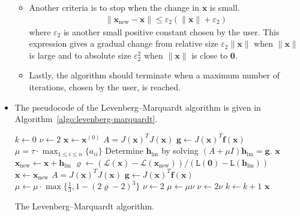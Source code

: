 \documentclass[10pt]{article}
\newcommand{\ve}[1]{\mathbf{#1}}
\newcommand{\mrm}[1]{\mathrm{#1}}
\newcommand{\mcal}[1]{\mathcal{#1}}
\begin{document}
\begin{itemize}
\begin{itemize}
        \item Another criteria is to stop when the change in $\ve{x}$ is small.
        \begin{align*}
            \| \ve{x}_{\mrm{new}} - \ve{x} \| \leq \varepsilon_2 (\| \ve{x}\| + \varepsilon_2)
        \end{align*}
        where $\varepsilon_2$ is another small positive constant chosen by the user. This expression gives a gradual change from relative size $\varepsilon_2 \| \ve{x}\|$ when $\| \ve{x}\|$ is large and to absolute size $\varepsilon_2^2$ when $\| \ve{x} \|$ is close to $\ve{0}$.

        \item Lastly, the algorithm should terminate when a maximum number of iterations, chosen by the user, is reached.
    \end{itemize}

    \item The pseudocode of the Levenberg--Marquardt algorithm is given in Algorithm~\ref{algo:levenberg-marquardt}.

    \begin{algorithm}[t]
        \begin{algorithmic}
            \State $k \gets 0$
            \State $\nu \gets 2$
            \State $\ve{x} \gets \ve{x}^{(0)}$
            \State $A = J(\ve{x})^T J(\ve{x})$
            \State $\ve{g} \gets J(\ve{x})^T \ve{f}(\ve{x})$
            \State $\mu = \tau \cdot \max_{1 \leq i \leq n} \{a_{ii}\}$
            \While {$\| \ve{g} \|_\infty > \varepsilon_1$ {\bf and} $k \leq k_{\max}$}
                \State Determine $\ve{h}_{\mrm{lm}}$ by solving $(A + \mu I)\ve{h}_{\mrm{lm}} = \ve{g}$.
                \If {$\| \ve{h}_{\mrm{lm}} \leq \varepsilon_2 (\| \ve{x}\| + \varepsilon_2)$}
                    \State \Return $\ve{x}$
                \EndIf
                \State $\ve{x}_{\mrm{new}} \gets \ve{x} + \ve{h}_{\mrm{lm}}$
                \State $\varrho \gets (\mcal{L}(\ve{x}) - \mcal{L}(\ve{x}_{\mrm{new}})) / (\mathtt{L}(\ve{0}) - \mathtt{L}(\ve{h}_{\mrm{lm}}))$
                    \State $\ve{x} \gets \ve{x}_{\mrm{new}}$
                    \State $A = J(\ve{x})^T J(\ve{x})$
                    \State $\ve{g} \gets J(\ve{x})^T \ve{f}(\ve{x})$
                    \State $\mu \gets \mu \cdot \max\{ \frac{1}{3}, 1 - (2\varrho -2)^3 \}$
                    \State $\nu \gets 2$
                \Else
                    \State $\mu \gets \mu \nu$
                    \State $\nu \gets 2\nu$
                \EndIf
                \State $k \gets k+1$
            \EndWhile
            \State \Return $\ve{x}$
        \end{algorithmic}
        \caption{The Levenberg--Marquardt algorithm.}
        \label{algo:levenberg-marquardt}
    \end{algorithm}
\end{itemize}




\end{document}
